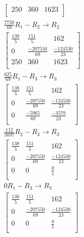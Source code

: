 \documentclass[12pt letter]{report}
\begin{document}
{\begin{enumerate}
\begin{align*}
\begin{bmatrix}
              250  & 360  & 1623  \\
            \end{bmatrix}                        \\
            \frac{7750}{69}R_1 - R_2  \rightarrow R_2  \\
            \begin{bmatrix}
              \frac{138}{5} & \frac{151}{5}      & 162                \\
              0             & \frac{-207550}{69} & \frac{-124530}{23} \\
              250           & 360                & 1623               \\
            \end{bmatrix}
            \\
            \frac{625}{69}R_1 - R_3  \rightarrow R_3   \\
            \begin{bmatrix}
              \frac{138}{5} & \frac{151}{5}      & 162                \\
              0             & \frac{-207550}{69} & \frac{-124530}{23} \\
              0             & \frac{-5965}{69}   & \frac{-3579}{23}   \\
            \end{bmatrix}
            \\
            \frac{112}{3897}R_2 - R_3  \rightarrow R_3 \\
            \begin{bmatrix}
              \frac{138}{5} & \frac{151}{5}      & 162                \\
              0             & \frac{-207550}{69} & \frac{-124530}{23} \\
              0             & 0                  & \frac{0}{1}        \\
            \end{bmatrix}
            \\
            0R_1 - R_3  \rightarrow R_3                \\
            \begin{bmatrix}
              \frac{138}{5} & \frac{151}{5}      & 162                \\
              0             & \frac{-207550}{69} & \frac{-124530}{23} \\
              0             & 0                  & \frac{0}{1}        \\
            \end{bmatrix}

\end{align*}
\end{enumerate}}
\end{document}
